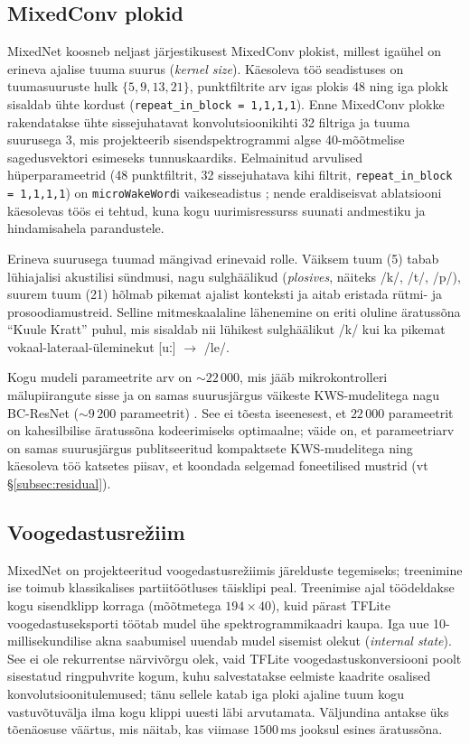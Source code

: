 \subsection{MixedConv plokid}

MixedNet koosneb neljast järjestikusest MixedConv plokist, millest igaühel on erineva ajalise tuuma suurus (\emph{kernel size}). Käesoleva töö seadistuses on tuumasuuruste hulk $\{5, 9, 13, 21\}$, punktfiltrite arv igas plokis 48 ning iga plokk sisaldab ühte kordust (\texttt{repeat\_in\_block\,=\,1,1,1,1}). Enne MixedConv plokke rakendatakse ühte sissejuhatavat konvolutsioonikihti 32 filtriga ja tuuma suurusega 3, mis projekteerib sisendspektrogrammi algse 40-mõõtmelise sagedusvektori esimeseks tunnuskaardiks. Eelmainitud arvulised hüperparameetrid (48 punktfiltrit, 32 sissejuhatava kihi filtrit, \texttt{repeat\_in\_block\,=\,1,1,1,1}) on \texttt{microWakeWord}i vaikeseadistus \cite{microwakeword2026}; nende eraldiseisvat ablatsiooni käesolevas töös ei tehtud, kuna kogu uurimisressurss suunati andmestiku ja hindamisahela parandustele.

Erineva suurusega tuumad mängivad erinevaid rolle. Väiksem tuum (5) tabab lühiajalisi akustilisi sündmusi, nagu sulghäälikud (\emph{plosives}, näiteks /k/, /t/, /p/), suurem tuum (21) hõlmab pikemat ajalist konteksti ja aitab eristada rütmi- ja prosoodiamustreid. Selline mitme\-skaalaline lähenemine on eriti oluline äratussõna \enquote{Kuule Kratt} puhul, mis sisaldab nii lühikest sulghäälikut /k/ kui ka pikemat vokaal-lateraal-üleminekut [uː] $\rightarrow$ /le/.

Kogu mudeli parameetrite arv on ${\sim}22\,000$, mis jääb mikrokontrolleri mälupiirangute sisse ja on samas suurusjärgus väikeste KWS-mudelitega nagu BC-ResNet (${\sim}9\,200$ parameetrit) \cite{choi2021bcresnet}. See ei tõesta iseenesest, et $22\,000$ parameetrit on kahesilbilise äratussõna kodeerimiseks optimaalne; väide on, et parameetriarv on samas suurusjärgus publitseeritud kompaktsete KWS-mudelitega ning käesoleva töö katsetes piisav, et koondada selgemad foneetilised mustrid (vt §\ref{subsec:residual}).

\subsection{Voogedastusrežiim}
\label{subsec:streaming}

MixedNet on projekteeritud voogedastusrežiimis järelduste tegemiseks; treenimine ise toimub klassikalises partiitöötluses täisklipi peal. Treenimise ajal töödeldakse kogu sisendklipp korraga (mõõtmetega $194 \times 40$), kuid pärast TFLite voogedastuseksporti töötab mudel ühe spektrogrammikaadri kaupa. Iga uue 10-millisekundilise akna saabumisel uuendab mudel sisemist olekut (\emph{internal state}). See ei ole rekurrentse närvivõrgu olek, vaid TFLite voogedastuskonversiooni poolt sisestatud ringpuhvrite kogum, kuhu salvestatakse eelmiste kaadrite osalised konvolutsioonitulemused; tänu sellele katab iga ploki ajaline tuum kogu vastuvõtuvälja ilma kogu klippi uuesti läbi arvutamata. Väljundina antakse üks tõenäosuse väärtus, mis näitab, kas viimase $1500\,\mathrm{ms}$ jooksul esines äratussõna.

